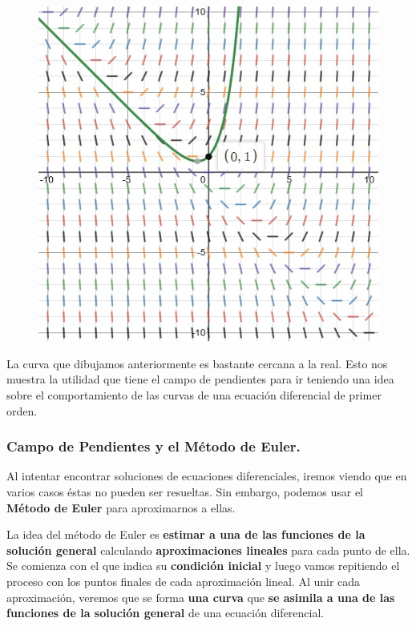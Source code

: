 \documentclass[12pt]{article}
\begin{document}
\newpage

\begin{figure}[hbt!]
\centering
\includegraphics[scale=0.5]{img/slope-field-3.jpg}
\end{figure}

La curva que dibujamos anteriormente es bastante cercana a la real. Esto nos muestra la utilidad que tiene el campo de pendientes para ir teniendo una idea sobre el comportamiento de las curvas de una ecuación diferencial de primer orden.

\subsubsection{Campo de Pendientes y el Método de Euler.}

Al intentar encontrar soluciones de ecuaciones diferenciales, iremos viendo que en varios casos éstas no pueden ser resueltas. Sin embargo, podemos usar el \textbf{Método de Euler} para aproximarnos a ellas.

La idea del método de Euler es \textbf{estimar a una de las funciones de la solución general} calculando \textbf{aproximaciones lineales} para cada punto de ella. Se comienza con el que indica su \textbf{condición inicial} y luego vamos repitiendo el proceso con los puntos finales de cada aproximación lineal. Al unir cada aproximación, veremos que se forma \textbf{una curva} que \textbf{se asimila a una de las funciones de la solución general} de una ecuación diferencial.
\end{document}
